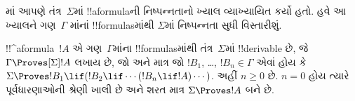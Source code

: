 \documentclass[../../../include/open-logic-section]{subfiles}
\begin{document}


માં આપણે તંત્ર~$\Sigma$માં !!a{formula}ની
નિષ્પન્નતાનો ખ્યાલ વ્યાખ્યાયિત કર્યો હતો. હવે આ ખ્યાલને ગણ~$\Gamma$
માંનાં !!{formula}sમાંથી $\Sigma$માં નિષ્પન્નતા સુધી વિસ્તારીશું.

\begin{defn}
  !!^a{formula}~$!A$ એ ગણ~$\Gamma$માંના !!{formula}sમાંથી
  તંત્ર~$\Sigma$માં !!{derivable} છે, જે $\Gamma \Proves[\Sigma] !A$
  લખાય છે, જો અને માત્ર જો $!B_1$, \dots, $!B_n \in \Gamma$ એવાં હોય કે
  $\Sigma \Proves !B_1 \lif (!B_2 \lif \cdots (!B_n \lif !A)
  \cdots)$.
  અહીં $n \geq 0$ છે. $n=0$ હોય ત્યારે પૂર્વધારણાઓની શ્રેણી
  ખાલી છે અને શરત માત્ર $\Sigma \Proves !A$ બને છે.
\end{defn}

\end{document}
